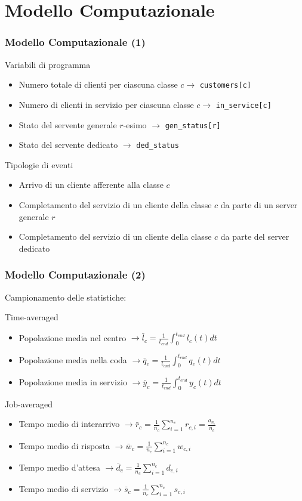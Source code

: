 \documentclass[
	usepdftitle=false,
	xcolor={table, dvipsnames},
	hyperref={
		pdftitle={Studio delle prestazioni di un Ufficio Postale ispirato a Poste Italiane},
    	pdfauthor={A. Chillotti, C. Cuffaro e S. Tiberi}
    }
]{beamer}
\begin{document}
\section{Modello Computazionale}
\begin{frame}
\frametitle{Modello Computazionale (1)}
\begin{block}{Variabili di programma}
\begin{itemize}
\item Numero totale di clienti per ciascuna classe $c \to$ \texttt{customers[c]}
\item Numero di clienti in servizio per ciascuna classe $c \to$ \texttt{in\_service[c]}
\item Stato del servente generale $r$-esimo $\to$ \texttt{gen\_status[r]}
\item Stato del servente dedicato $\to$ \texttt{ded\_status}
\end{itemize}
\end{block}
\begin{block}{Tipologie di eventi}
\begin{itemize}
\item Arrivo di un cliente afferente alla classe $c$
\item Completamento del servizio di un cliente della classe $c$ da parte di un server generale $r$
\item Completamento del servizio di un cliente della classe $c$ da parte del server dedicato
\end{itemize} 
\end{block}
\end{frame}

\begin{frame}
\frametitle{Modello Computazionale (2)}
Campionamento delle statistiche:
\begin{block}{Time-averaged}
\begin{itemize}
\item Popolazione media nel centro $\to\bar{l}_c=\frac{1}{t_{end}}\int_0^{t_{end}} l_c(t) dt$
\item Popolazione media nella coda $\to\bar{q}_c=\frac{1}{t_{end}}\int_0^{t_{end}} q_c(t) dt$
\item Popolazione media in servizio $\to\bar{y}_c=\frac{1}{t_{end}}\int_0^{t_{end}} y_c(t) dt$
\end{itemize}
\end{block}
\begin{block}{Job-averaged}
\begin{itemize}
\item Tempo medio di interarrivo $\to\bar{r}_c = \frac{1}{n_c} \sum_{i=1}^{n_c} r_{c,i} = \frac{a_{n_c}}{n_c}$
\item Tempo medio di risposta $\to\bar{w}_c = \frac{1}{n_c} \sum_{i=1}^{n_c} w_{c,i}$
\item Tempo medio d'attesa $\to\bar{d}_c = \frac{1}{n_c} \sum_{i=1}^{n_c} d_{c,i}$
\item Tempo medio di servizio $\to\bar{s}_c = \frac{1}{n_c} \sum_{i=1}^{n_c} s_{c,i}$
\end{itemize}
\end{block}
\end{frame}
\end{document}
